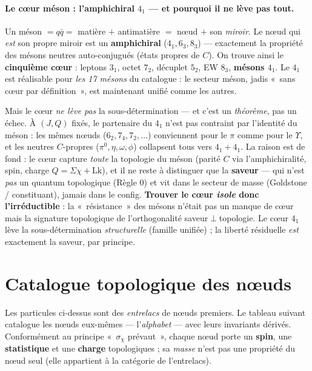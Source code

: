 \documentclass[11pt]{article}
\begin{document}
\paragraph{Le cœur méson : l'amphichiral $4_1$ --- et pourquoi il ne lève pas tout.} Un méson $=q\bar q=$ matière $+$ antimatière $=$ nœud $+$ son \emph{miroir}. Le nœud qui \emph{est} son propre miroir est un \textbf{amphichiral} ($4_1,6_3,8_3$) --- exactement la propriété des mésons neutres auto-conjugués (états propres de $C$). On trouve ainsi le \textbf{cinquième cœur} : leptons $3_1$, octet $7_2$, décuplet $5_2$, EW $8_3$, \textbf{mésons $4_1$}. Le $4_1$ est réalisable pour \emph{les 17 mésons} du catalogue : le secteur méson, jadis «~sans cœur par définition~», est maintenant unifié comme les autres.

Mais le cœur \emph{ne lève pas} la sous-détermination --- et c'est un \emph{théorème}, pas un échec. À $(J,Q)$ fixés, le partenaire du $4_1$ n'est pas contraint par l'identité du méson : les mêmes nœuds ($6_2,7_4,7_2,\dots$) conviennent pour le $\pi$ comme pour le $\Upsilon$, et les neutres $C$-propres ($\pi^0,\eta,\omega,\phi$) collapsent tous vers $4_1{+}4_1$. La raison est de fond : le cœur capture \emph{toute} la topologie du méson (parité $C$ via l'amphichiralité, spin, charge $Q=\Sigma\chi+\mathrm{Lk}$), et il ne reste à distinguer que la \textbf{saveur} --- qui n'est \emph{pas} un quantum topologique (Règle 0) et vit dans le secteur de masse (Goldstone / constituant), jamais dans le config. \textbf{Trouver le cœur \emph{isole} donc l'irréductible} : la «~résistance~» des mésons n'était pas un manque de cœur mais la signature topologique de l'orthogonalité saveur$\perp$topologie. Le cœur $4_1$ lève la sous-détermination \emph{structurelle} (famille unifiée) ; la liberté résiduelle \emph{est} exactement la saveur, par principe.

\section{Catalogue topologique des nœuds}

Les particules ci-dessus sont des \emph{entrelacs} de nœuds premiers. Le tableau suivant catalogue les nœuds eux-mêmes --- l'\emph{alphabet} --- avec leurs invariants dérivés. Conformément au principe «~$\sigma_\chi$ prévaut~», chaque nœud porte un \textbf{spin}, une \textbf{statistique} et une \textbf{charge} topologiques ; sa \emph{masse} n'est pas une propriété du nœud seul (elle appartient à la catégorie de l'entrelacs).
\end{document}

